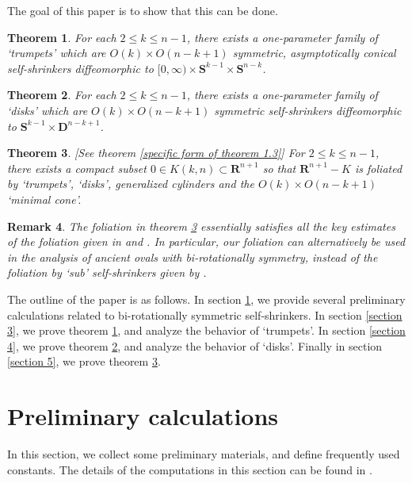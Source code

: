 \documentclass[pdflatex,sn-mathphys-num]{sn-jnl}
\newtheorem{theorem}{Theorem}[section]
\newtheorem{remark}[theorem]{Remark}
\begin{document}
The goal of this paper is to show that this can be done.
\begin{theorem}\label{Main theorem : Existence of birotational trumpets}
For each $2 \leq k \leq n-1$, there exists a one-parameter family of `trumpets' which are $O(k) \times O(n-k+1)$ symmetric, asymptotically conical self-shrinkers diffeomorphic to $[0, \infty) \times \mathbf{S}^{k-1} \times \mathbf{S}^{n-k}$.     
\end{theorem}
\begin{theorem}\label{Main theorem : existence of birotational caps}
   For each $2 \leq k \leq n-1$, there exists a one-parameter family of `disks' which are $O(k) \times O(n-k+1)$ symmetric self-shrinkers diffeomorphic to $\mathbf{S}^{k-1} \times \mathbf{D}^{n-k+1}$.
\end{theorem}
\begin{theorem}\label{Main theorem : Foliation}[See theorem \ref{specific form of theorem 1.3}]
    For $2 \leq k \leq n-1$, there exists a compact subset $0 \in K(k,n) \subset \mathbf{R}^{n+1}$ so that $\mathbf{R}^{n+1} - K$ is foliated by `trumpets', `disks', generalized cylinders and the $O(k) \times O(n-k+1)$ `minimal cone'.
\end{theorem}
\begin{remark}
    The foliation in theorem \ref{Main theorem : Foliation} essentially satisfies all the key estimates of the foliation given in \cite{ADS} and \cite{Du}. In particular, our foliation can alternatively be used in the analysis of ancient ovals with bi-rotationally symmetry, instead of the foliation by `sub' self-shrinkers given by \cite{Du}.
\end{remark}

The outline of the paper is as follows. In section \ref{prereq}, we provide several preliminary calculations related to bi-rotationally symmetric self-shrinkers. In section \ref{section 3}, we prove theorem \ref{Main theorem : Existence of birotational trumpets}, and analyze the behavior of `trumpets'. In section \ref{section 4}, we prove theorem \ref{Main theorem : existence of birotational caps}, and analyze the behavior of `disks'. Finally in section \ref{section 5}, we prove theorem \ref{Main theorem : Foliation}. 
\section{Preliminary calculations}\label{prereq}
In this section, we collect some preliminary materials, and define frequently used constants. The details of the computations in this section can be found in \cite{survey}. \\
\end{document}
